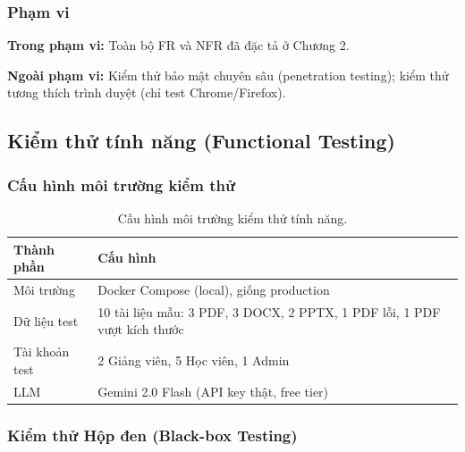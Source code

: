 \subsubsection{Phạm vi}

\textbf{Trong phạm vi:} Toàn bộ FR và NFR đã đặc tả ở Chương 2.

\textbf{Ngoài phạm vi:} Kiểm thử bảo mật chuyên sâu (penetration testing);
kiểm thử tương thích trình duyệt (chỉ test Chrome/Firefox).

\subsection{Kiểm thử tính năng (Functional Testing)}

\subsubsection{Cấu hình môi trường kiểm thử}

\begin{table}[H]
    \centering
    \caption{Cấu hình môi trường kiểm thử tính năng.}
    \label{tab:test-env-func}
    \begin{tabular}{p{4cm}p{10.5cm}}
        \toprule
        \textbf{Thành phần} & \textbf{Cấu hình} \\
        \midrule
        Môi trường & Docker Compose (local), giống production \\
        Dữ liệu test & 10 tài liệu mẫu: 3 PDF, 3 DOCX, 2 PPTX, 1 PDF lỗi, 1 PDF vượt kích thước \\
        Tài khoản test & 2 Giảng viên, 5 Học viên, 1 Admin \\
        LLM & Gemini 2.0 Flash (API key thật, free tier) \\
        \bottomrule
    \end{tabular}
\end{table}

\subsubsection{Kiểm thử Hộp đen (Black-box Testing)}

